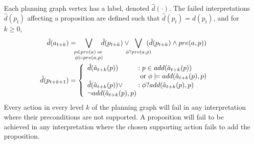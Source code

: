 \documentclass{article}
\begin{document}
 Each planning graph vertex has a label, denoted $\hat{d}(\cdot)$.  The failed
 interpretations $\hat{d}(p_t) $ affecting a proposition are defined such that
 $\hat{d}(p_t) = d(p_t)$, and for $k \geq 0$,
\begin{align}
\hat{d}({a}_{t+k}) &= \hspace*{-.2cm} 
\bigvee\limits_{\substack{p \in pre({a}) \;\text{or}\;\\ \phi\models
pre(a, p) }} \hspace*{-.2cm}
\hat{d}(p_{t+k}) \vee \hspace*{-.25cm} \bigvee\limits_{\phi?pre(a, p)}
\hspace*{-.25cm} (\hat{d}(p_{t+k})  \wedge pre({a}, p) )\notag\\ \notag
\hspace*{-.6cm} \hat{d}(p_{t+k+1}) &= \left\{\begin{array}{l@{\;}l@{\;}r} \hat{d}(\hat{a}_{t+k}(p)) & : p \in add(\hat{a}_{t+k}(p))\\
 & \;\text{or}\; \phi\models
add(\hat{a}_{t+k}(p), p)\\ 
\hat{d}(\hat{a}_{t+k}(p)) \vee& : \phi?add(\hat{a}_{t+k}(p), p)\\
\neg add(\hat{a}_{t+k}(p), p)
\end{array}\right. \hspace*{-.1cm}\label{eqn:hprop}
\end{align}
Every action in every level $k$ of the planning graph will fail in any
interpretation where their preconditions are not supported.  A proposition will
fail  to be achieved in any interpretation where the chosen supporting action
fails to add the proposition.

\end{document}
